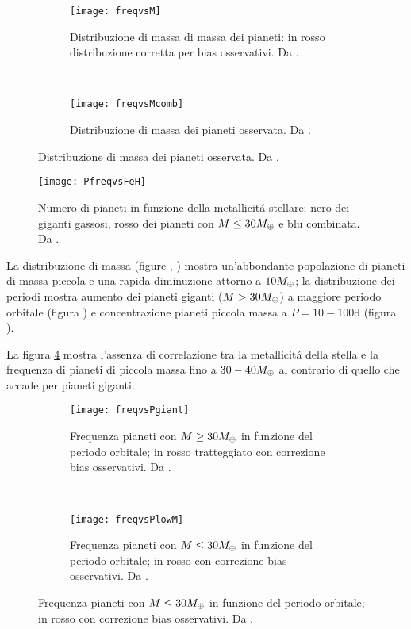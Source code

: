 \begin{figure}[!ht]
\begin{subfigure}[b]{0.49\textwidth} \centering \texttt{[image: freqvsM]}
\caption{Distribuzione di massa di massa dei pianeti: in rosso distribuzione corretta per bias osservativi. Da \cite{mayor2011harps}.}\label{fig:freqvsM} \end{subfigure}
~
\begin{subfigure}[b]{0.49\textwidth} \centering \texttt{[image: freqvsMcomb]}
\caption{Distribuzione di massa dei pianeti osservata. Da \cite{mayor2011harps}.}\label{fig:freqvsMcomb}
\end{subfigure}
\end{figure}

\begin{figure}[!ht]
\centering \texttt{[image: PfreqvsFeH]}
\caption{Numero di pianeti in funzione della metallicit\'a stellare: nero dei giganti gassosi, rosso dei pianeti con $M\leq30M_{\oplus}{}$ e blu combinata. Da \cite{mayor2011harps}.}\label{fig:PfreqvsFeH}
\end{figure}

La distribuzione di massa (figure , ) mostra un'abbondante popolazione di pianeti di massa piccola e una rapida diminuzione attorno a $10M_{\oplus}{}$; la distribuzione dei periodi mostra aumento dei pianeti giganti ($M>30M_{\oplus}{}$) a maggiore periodo orbitale (figura ) e concentrazione pianeti piccola massa a $P=10-100\si{\day}$ (figura ).

La figura \ref{fig:PfreqvsFeH} mostra l'assenza di correlazione tra la metallicit\'a della stella e la frequenza di pianeti di piccola massa fino a $30-40M_{\oplus}{}$ al contrario di quello che accade per pianeti giganti.

\begin{figure}[!ht]
\begin{subfigure}[b]{0.49\textwidth} \centering \texttt{[image: freqvsPgiant]}\caption{Frequenza pianeti con $M\geq 30M_{\oplus}{}$ in funzione del periodo orbitale; in rosso  tratteggiato con correzione bias osservativi. Da \cite{mayor2011harps}.}\label{fig:freqvsPgiant} \end{subfigure}
~
\begin{subfigure}[b]{0.49\textwidth} \centering \texttt{[image: freqvsPlowM]} \caption{Frequenza pianeti con $M\leq 30M_{\oplus}{}$ in funzione del periodo orbitale; in rosso con correzione bias osservativi. Da \cite{mayor2011harps}.}\label{fig:freqvsPlowM}
\end{subfigure}
\end{figure}

